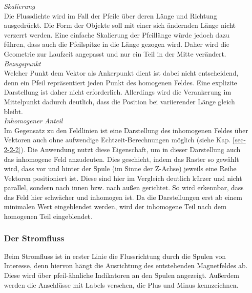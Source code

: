 \textit{Skalierung}\\
Die Flussdichte wird im Fall der Pfeile über deren Länge und Richtung ausgedrückt. Die Form der Objekte soll mit einer sich ändernden Länge nicht verzerrt werden. Eine einfache Skalierung der Pfeillänge würde jedoch dazu führen, dass auch die Pfeilspitze in die Länge gezogen wird. Daher wird die Geometrie zur Laufzeit angepasst und nur ein Teil in der Mitte verändert.\\

\textit{Bezugspunkt}\\
Welcher Punkt dem Vektor als Ankerpunkt dient ist dabei nicht entscheidend, denn ein Pfeil repräsentiert jeden Punkt des homogenen Feldes. Eine explizite Darstellung ist daher nicht erforderlich. Allerdings wird die Verankerung im Mittelpunkt dadurch deutlich, dass die Position bei variierender Länge gleich bleibt.\\

\textit{Inhomogener Anteil}\\
Im Gegensatz zu den Feldlinien ist eine Darstellung des inhomogenen Feldes über Vektoren auch ohne aufwendige Echtzeit-Berechnungen möglich (siehe Kap. \ref{sec-2-2-2}). Die Anwendung nutzt diese Eigenschaft, um in dieser Darstellung auch das inhomogene Feld anzudeuten. Dies geschieht, indem das Raster so gewählt wird, dass vor und hinter der Spule (im Sinne der Z-Achse) jeweils eine Reihe Vektoren positioniert ist. Diese sind hier im Vergleich deutlich kürzer und nicht parallel, sondern nach innen bzw. nach außen gerichtet. So wird erkennbar, dass das Feld hier schwächer und inhomogen ist. Da die Darstellungen erst ab einem minimalen Wert eingeblendet werden, wird der inhomogene Teil nach dem homogenen Teil eingeblendet.\\



\subsubsection{Der Stromfluss} 
\label{sec-4-2-3}
Beim Stromfluss ist in erster Linie die Flussrichtung durch die Spulen von Interesse, denn hiervon hängt die Ausrichtung des entstehenden Magnetfeldes ab. Diese wird über pfeil-ähnliche Indikatoren an den Spulen angezeigt. Außerdem werden die Anschlüsse mit Labels versehen, die Plus und Minus kennzeichnen.

